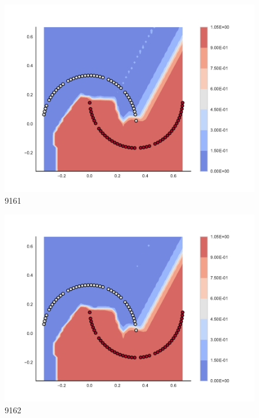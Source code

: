 \begin{subfigure}[b]{0.09\textwidth}
    \includegraphics[clip, trim=2.35cm 1.75cm 4.5cm 0cm,width=\textwidth]{img/convergence/9161.pdf}
    \caption{9161}
    \label{fig:convergence_9161}
\end{subfigure}
%
\begin{subfigure}[b]{0.09\textwidth}
    \includegraphics[clip, trim=2.35cm 1.75cm 4.5cm 0cm,width=\textwidth]{img/convergence/9162.pdf}
    \caption{9162}
    \label{fig:convergence_9162}
\end{subfigure}
%
